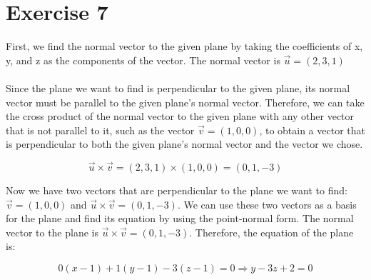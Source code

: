 \documentclass{article}
\begin{document}
\section*{Exercise 7}
First, we find the normal vector to the given plane by taking the coefficients of x, y, and z as the components of the vector. The normal vector is $\vec{u} =(2, 3, 1)$
\\\\
Since the plane we want to find is perpendicular to the given plane, its normal vector must be parallel to the given plane's normal vector. Therefore, we can take the cross product of the normal vector to the given plane with any other vector that is not parallel to it, such as the vector $\vec{v}= (1, 0, 0)$, to obtain a vector that is perpendicular to both the given plane's normal vector and the vector we chose.

$$\vec{u} \times \vec{v} = (2, 3, 1) \times (1, 0, 0) = (0, 1, -3)$$

Now we have two vectors that are perpendicular to the plane we want to find: $\vec{v}=(1, 0, 0)$ and $\vec{u}\times \vec{v} =(0, 1, -3)$. We can use these two vectors as a basis for the plane and find its equation by using the point-normal form.
The normal vector to the plane is $\vec{u}\times \vec{v}  =(0, 1, -3)$. Therefore, the equation of the plane is:

$$0(x - 1) + 1(y - 1) - 3(z - 1) = 0 \Rightarrow y - 3z + 2 = 0$$

\begin{center}
\end{center}
\end{document}
